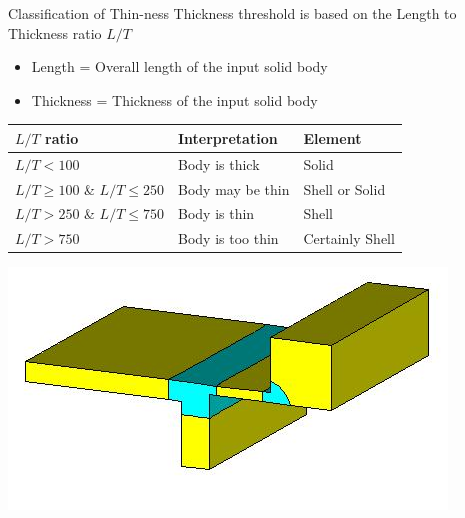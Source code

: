 %
\begin{frame}{Classification of Thin-ness}
Thickness threshold is based on the Length to Thickness ratio  $L/T$ 

\begin{itemize}[noitemsep,label=\textbullet,topsep=2pt,parsep=2pt,partopsep=2pt]
\item Length = Overall length of the input solid body
\item Thickness = Thickness of the input solid body
\end{itemize}
\begin{tabular}[h]{@{}l l l  @{}}
\toprule

{\bf $L/T$  ratio } & {\bf Interpretation } & {\bf Element}\\
\midrule
$L/T < 100$ & Body is thick & Solid \\
$L/T \geq 100$ \& $L/T \leq 250$ & Body may be thin & Shell or Solid \\
$L/T > 250$ \& $L/T \leq 750$ & Body is thin & Shell \\
$L/T > 750$ & Body is too thin & Certainly Shell \\
\bottomrule
\end{tabular}


\includegraphics[scale=0.4]{../Common/images/PriceThin.jpg}

\end{frame}



